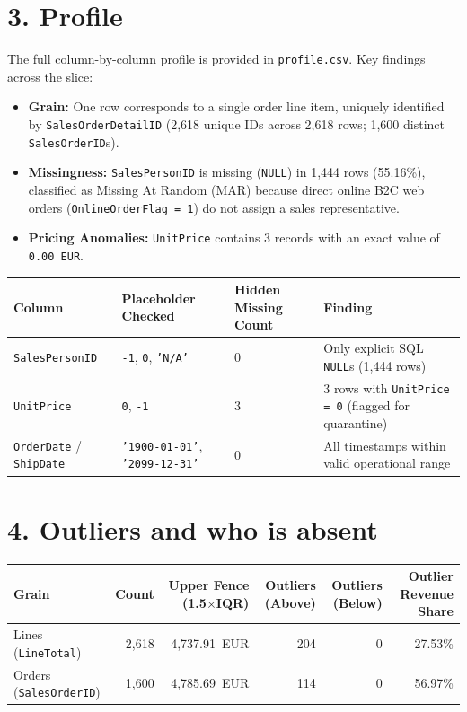 \documentclass[10pt,a4paper]{article}
\begin{document}
\section*{3. Profile}
The full column-by-column profile is provided in \texttt{profile.csv}. Key findings across the slice:
\begin{itemize}
    \item \textbf{Grain:} One row corresponds to a single order line item, uniquely identified by \texttt{SalesOrderDetailID} (2,618 unique IDs across 2,618 rows; 1,600 distinct \texttt{SalesOrderID}s).
    \item \textbf{Missingness:} \texttt{SalesPersonID} is missing (\texttt{NULL}) in 1,444 rows (55.16\%), classified as Missing At Random (MAR) because direct online B2C web orders (\texttt{OnlineOrderFlag = 1}) do not assign a sales representative.
    \item \textbf{Pricing Anomalies:} \texttt{UnitPrice} contains 3 records with an exact value of \texttt{0.00~EUR}.
\end{itemize}

\begin{table}[h!]
\centering
\begin{tabular}{llll}
\toprule
\textbf{Column} & \textbf{Placeholder Checked} & \textbf{Hidden Missing Count} & \textbf{Finding} \\
\midrule
\texttt{SalesPersonID} & \texttt{-1}, \texttt{0}, \texttt{'N/A'} & 0 & Only explicit SQL \texttt{NULL}s (1,444 rows) \\
\texttt{UnitPrice} & \texttt{0}, \texttt{-1} & 3 & 3 rows with \texttt{UnitPrice = 0} (flagged for quarantine) \\
\texttt{OrderDate} / \texttt{ShipDate} & \texttt{'1900-01-01'}, \texttt{'2099-12-31'} & 0 & All timestamps within valid operational range \\
\bottomrule
\end{tabular}
\end{table}

\section*{4. Outliers and who is absent}
\begin{table}[h!]
\centering
\begin{tabular}{lrrrrr}
\toprule
\textbf{Grain} & \textbf{Count} & \textbf{Upper Fence (1.5$\times$IQR)} & \textbf{Outliers (Above)} & \textbf{Outliers (Below)} & \textbf{Outlier Revenue Share} \\
\midrule
Lines (\texttt{LineTotal}) & 2,618 & 4,737.91~EUR & 204 & 0 & 27.53\% \\
Orders (\texttt{SalesOrderID}) & 1,600 & 4,785.69~EUR & 114 & 0 & 56.97\% \\
\bottomrule
\end{tabular}
\end{table}
\end{document}
